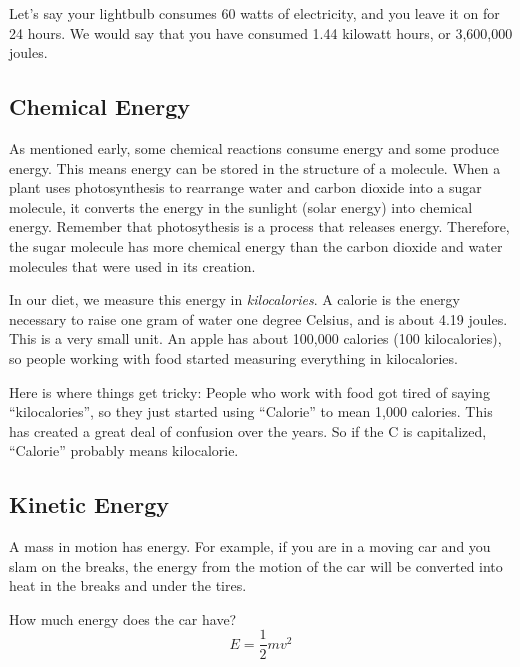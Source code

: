 Let's say your lightbulb consumes 60 watts of electricity, and you leave it on for 24 hours.
We would say that you have consumed 1.44 kilowatt hours, or 3,600,000 joules.


\subsection{Chemical Energy}

As mentioned early, some chemical reactions consume energy and some
produce energy. This means energy can be stored in the structure of a
molecule. When a plant uses photosynthesis to rearrange water and
carbon dioxide into a sugar molecule, it converts the energy in
the sunlight (solar energy) into chemical energy. Remember that photosythesis is a process that releases energy.
Therefore, the sugar molecule has more chemical energy than the carbon dioxide and water molecules that were
used in its creation.

In our diet, we measure this energy in \textit{kilocalories}. A
calorie is the energy necessary to raise one gram of water one degree
Celsius, and is about 4.19 joules. This is a very small unit. An apple
has about 100,000 calories (100 kilocalories), so people working with food started
measuring everything in kilocalories.

Here is where things get tricky: People who work with food got tired of
saying ``kilocalories'', so they just started using ``Calorie'' to
mean 1,000 calories. This has created a great deal of confusion over the
years. So if the C is capitalized, ``Calorie'' probably means kilocalorie.

\subsection{Kinetic Energy}

A mass in motion has energy. For example, if you are in a moving car
and you slam on the breaks, the energy from the motion of the
car will be converted into heat in the breaks and under the tires.

How much energy does the car have?
\[
E = \frac{1}{2} m v^2
\]

